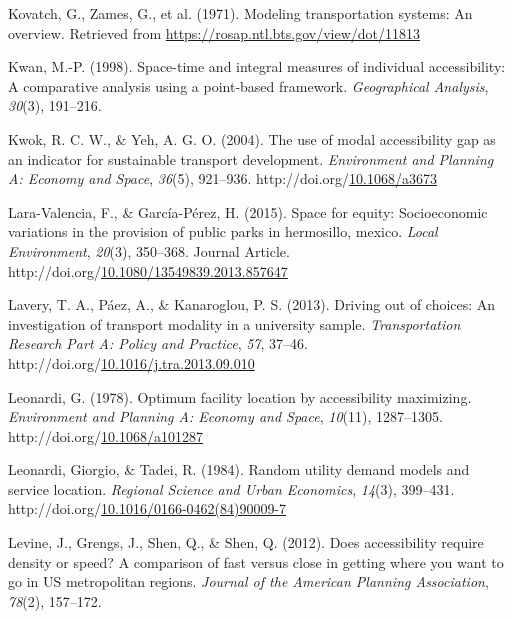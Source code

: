 \documentclass[
11pt, %
oneside, %
english, %
singlespacing, %
]{macthesis} %
\newlength{\cslhangindent}
\newenvironment{CSLReferences}[2] %
{\begin{list}{}{%
	\setlength{\itemindent}{0pt}
	\setlength{\leftmargin}{0pt}
	\setlength{\parsep}{0pt}
	\ifodd #1
	\setlength{\leftmargin}{\cslhangindent}
	\setlength{\itemindent}{-1\cslhangindent}
	\fi
	\setlength{\itemsep}{#2\baselineskip}}}
{\end{list}}
\begin{document}
\begin{CSLReferences}{1}{0}
Kovatch, G., Zames, G., et al. (1971). Modeling transportation systems: An overview. Retrieved from \url{https://rosap.ntl.bts.gov/view/dot/11813}

Kwan, M.-P. (1998). Space-time and integral measures of individual accessibility: A comparative analysis using a point-based framework. \emph{Geographical Analysis}, \emph{30}(3), 191--216.

Kwok, R. C. W., \& Yeh, A. G. O. (2004). The use of modal accessibility gap as an indicator for sustainable transport development. \emph{Environment and Planning A: Economy and Space}, \emph{36}(5), 921--936. http://doi.org/\href{https://doi.org/10.1068/a3673}{10.1068/a3673}

Lara-Valencia, F., \& García-Pérez, H. (2015). Space for equity: Socioeconomic variations in the provision of public parks in hermosillo, mexico. \emph{Local Environment}, \emph{20}(3), 350--368. Journal Article. http://doi.org/\href{https://doi.org/10.1080/13549839.2013.857647}{10.1080/13549839.2013.857647}

Lavery, T. A., Páez, A., \& Kanaroglou, P. S. (2013). Driving out of choices: {An} investigation of transport modality in a university sample. \emph{Transportation Research Part A: Policy and Practice}, \emph{57}, 37--46. http://doi.org/\href{https://doi.org/10.1016/j.tra.2013.09.010}{10.1016/j.tra.2013.09.010}

Leonardi, G. (1978). Optimum facility location by accessibility maximizing. \emph{Environment and Planning A: Economy and Space}, \emph{10}(11), 1287--1305. http://doi.org/\href{https://doi.org/10.1068/a101287}{10.1068/a101287}

Leonardi, Giorgio, \& Tadei, R. (1984). Random utility demand models and service location. \emph{Regional Science and Urban Economics}, \emph{14}(3), 399--431. http://doi.org/\href{https://doi.org/10.1016/0166-0462(84)90009-7}{10.1016/0166-0462(84)90009-7}

Levine, J., Grengs, J., Shen, Q., \& Shen, Q. (2012). Does accessibility require density or speed? A comparison of fast versus close in getting where you want to go in US metropolitan regions. \emph{Journal of the American Planning Association}, \emph{78}(2), 157--172.


\end{CSLReferences}
\end{document}
